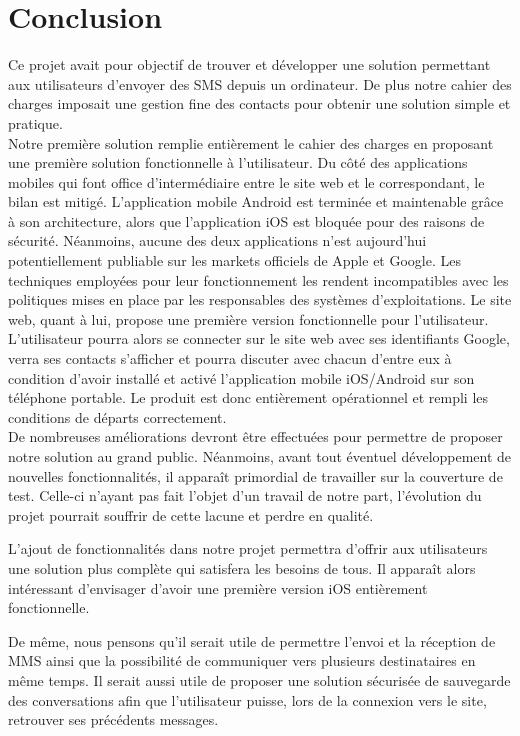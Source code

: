  \cleardoublepage

 

\chapter*{Conclusion}


 

Ce projet avait pour objectif de trouver et développer une solution permettant aux utilisateurs d'envoyer des SMS depuis un ordinateur.
De plus notre cahier des charges imposait une gestion fine des contacts pour obtenir une solution simple et pratique.
\\


Notre première solution remplie entièrement le cahier des charges en proposant une première solution fonctionnelle à l'utilisateur. 
Du côté des applications mobiles qui font office d'intermédiaire entre le site web et le correspondant, le bilan est mitigé. L'application mobile Android est terminée et maintenable grâce à son architecture, alors que l'application iOS est bloquée pour des raisons de sécurité.
Néanmoins, aucune des deux applications n'est aujourd'hui potentiellement publiable sur les markets officiels de Apple et Google. Les techniques employées pour leur fonctionnement les rendent incompatibles avec les politiques mises en place par les responsables des systèmes d'exploitations.
Le site web, quant à lui, propose une première version fonctionnelle pour l'utilisateur. L'utilisateur pourra alors se connecter sur le site web avec ses identifiants Google, verra ses contacts s'afficher et pourra discuter avec chacun d'entre eux à condition d'avoir installé et activé l'application mobile iOS/Android sur son téléphone portable.
Le produit est donc entièrement opérationnel et rempli les conditions de départs correctement.
\\


De nombreuses améliorations devront être effectuées pour permettre de proposer notre solution au grand public.
Néanmoins, avant tout éventuel développement de nouvelles fonctionnalités, il apparaît primordial de travailler sur la couverture de test. Celle-ci n'ayant pas fait l'objet d'un travail de notre part, l'évolution du projet pourrait souffrir de cette lacune et perdre en qualité.

L'ajout de fonctionnalités dans notre projet permettra d'offrir aux utilisateurs une solution plus complète qui satisfera les besoins de tous.
Il apparaît alors intéressant d'envisager d'avoir une première version iOS entièrement fonctionnelle.

De même, nous pensons qu'il serait utile de permettre l'envoi et la réception de MMS ainsi que la possibilité de communiquer vers plusieurs destinataires en même temps. Il serait aussi utile de proposer une solution sécurisée de sauvegarde des conversations afin que l'utilisateur puisse, lors de la connexion vers le site, retrouver ses précédents messages.
